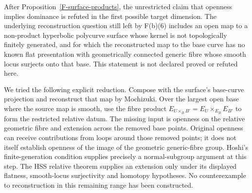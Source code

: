 \begin{remark}
\label{F-surface-open}
After Proposition~\ref{F-surface-products}, the unrestricted
claim that openness implies dominance is refuted in the first
possible target dimension. The underlying reconstruction
question still left by F(b)(6) includes an open map to a
non-product hyperbolic polycurve surface whose kernel is not
topologically finitely generated, and for which the reconstructed
map to the base curve has no known flat presentation with
geometrically connected generic fibre whose smooth locus
surjects onto that base. This statement is
not declared proved or refuted here.

We tried the following explicit reduction. Compose with the
surface's base-curve projection and reconstruct that map by
Mochizuki. Over the largest open base where the source map is
smooth, use the fibre product
$E_{U\times_B B'}=E_U\times_{E_B}E_{B'}$ to form the
restricted relative datum. The missing input is openness on the
relative geometric fibre and extension across the removed base
points. Original openness can receive contributions from loops
around those removed points; it does not itself establish
openness of the image of the geometric generic-fibre group.
Hoshi's finite-generation condition supplies precisely a
normal-subgroup argument at this step. The HSS relative theorem
supplies an extension only under its displayed flatness,
smooth-locus surjectivity and homotopy hypotheses. No counterexample to
reconstruction in this remaining range has been constructed.
\end{remark}

